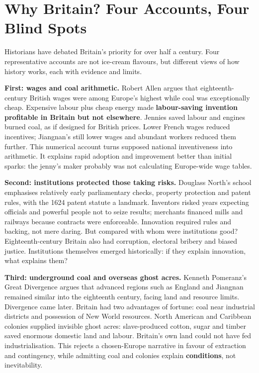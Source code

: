 \section{Why Britain? Four Accounts, Four Blind Spots}
Historians have debated Britain's priority for over half a century. Four representative accounts are not ice-cream flavours, but different views of how history works, each with evidence and limits.

\textbf{First: wages and coal arithmetic.} Robert Allen argues that eighteenth-century British wages were among Europe's highest while coal was exceptionally cheap. Expensive labour plus cheap energy made \textbf{labour-saving invention profitable in Britain but not elsewhere}. Jennies saved labour and engines burned coal, as if designed for British prices. Lower French wages reduced incentives; Jiangnan's still lower wages and abundant workers reduced them further. This numerical account turns supposed national inventiveness into arithmetic. It explains rapid adoption and improvement better than initial sparks: the jenny's maker probably was not calculating Europe-wide wage tables.

\textbf{Second: institutions protected those taking risks.} Douglass North's school emphasises relatively early parliamentary checks, property protection and patent rules, with the 1624 patent statute a landmark. Inventors risked years expecting officials and powerful people not to seize results; merchants financed mills and railways because contracts were enforceable. Innovation required rules and backing, not mere daring. But compared with whom were institutions good? Eighteenth-century Britain also had corruption, electoral bribery and biased justice. Institutions themselves emerged historically: if they explain innovation, what explains them?

\textbf{Third: underground coal and overseas ghost acres.} Kenneth Pomeranz's Great Divergence argues that advanced regions such as England and Jiangnan remained similar into the eighteenth century, facing land and resource limits. Divergence came later. Britain had two advantages of fortune: coal near industrial districts and possession of New World resources. North American and Caribbean colonies supplied invisible ghost acres: slave-produced cotton, sugar and timber saved enormous domestic land and labour. Britain's own land could not have fed industrialisation. This rejects a chosen-Europe narrative in favour of extraction and contingency, while admitting coal and colonies explain \textbf{conditions}, not inevitability.

